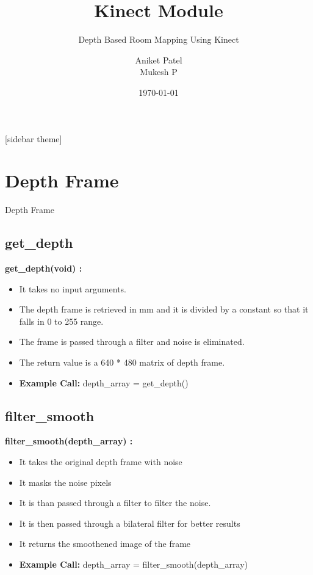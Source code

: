 \documentclass[10pt, a4paper]{beamer}
\begin{document}
	\title{Kinect Module}
	\subtitle{Depth Based Room Mapping Using Kinect}
	\author{Aniket Patel\\ Mukesh P}
	\date{\today}
	\frame{\titlepage}

[sidebar theme]
\section{Depth Frame}
\begin{frame}[allowframebreaks]{Depth Frame}
  \subsection{get\_depth}
    \textbf{get\_depth(void) : }
    \begin{itemize}
     \item It takes no input arguments.
     \item The depth frame is retrieved in mm and it is divided by a constant so that it falls in 0 to 255 range.
     \item The frame is passed through a filter and noise is eliminated.
     \item The return value is a 640 * 480 matrix of depth frame.
     \item \textbf{Example Call:} depth\_array = get\_depth()
    \end{itemize}
  \framebreak
  \subsection{filter\_smooth}
    \textbf{filter\_smooth(depth\_array) : }
    \begin{itemize}
     \item It takes the original depth frame with noise
     \item It masks the noise pixels
     \item It is than passed through a filter to filter the noise. 
     \item It is then passed through a bilateral filter for better results
     \item It returns the smoothened image of the frame
     \item \textbf{Example Call:} depth\_array = filter\_smooth(depth\_array)
    \end{itemize}
  \framebreak

\end{frame}
\end{document}
